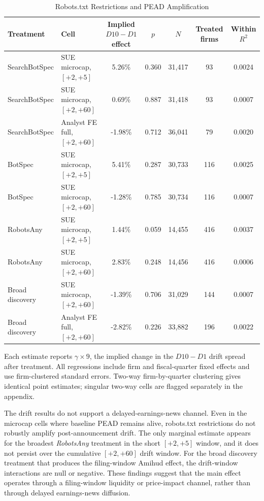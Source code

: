 \begin{table}[!htbp]
\centering
\caption{Robots.txt Restrictions and PEAD Amplification}
\label{tab:robots_pead_drift}
\begin{threeparttable}
\begin{tabular}{llccccc}
\toprule
Treatment & Cell & Implied \(D10-D1\) effect & \(p\) & \(N\) & Treated firms & Within \(R^2\) \\
\midrule
SearchBotSpec & SUE microcap, \([+2,+5]\)    &  5.26\% & 0.360 & 31,417 &  93 & 0.0024 \\
SearchBotSpec & SUE microcap, \([+2,+60]\)   &  0.69\% & 0.887 & 31,418 &  93 & 0.0007 \\
SearchBotSpec & Analyst FE full, \([+2,+60]\) & -1.98\% & 0.712 & 36,041 &  79 & 0.0020 \\
BotSpec       & SUE microcap, \([+2,+5]\)    &  5.41\% & 0.287 & 30,733 & 116 & 0.0025 \\
BotSpec       & SUE microcap, \([+2,+60]\)   & -1.28\% & 0.785 & 30,734 & 116 & 0.0007 \\
RobotsAny     & SUE microcap, \([+2,+5]\)    &  1.44\% & 0.059 & 14,455 & 416 & 0.0037 \\
RobotsAny     & SUE microcap, \([+2,+60]\)   &  2.83\% & 0.248 & 14,456 & 416 & 0.0006 \\
Broad discovery & SUE microcap, \([+2,+60]\) & -1.39\% & 0.706 & 31,029 & 144 & 0.0007 \\
Broad discovery & Analyst FE full, \([+2,+60]\) & -2.82\% & 0.226 & 33,882 & 196 & 0.0022 \\
\bottomrule
\end{tabular}
\begin{tablenotes}[flushleft]\footnotesize
\item Each estimate reports \(\gamma \times 9\), the implied change in the
\(D10-D1\) drift spread after treatment.  All regressions include firm and
fiscal-quarter fixed effects and use firm-clustered standard errors.
Two-way firm-by-quarter clustering gives identical point estimates; singular
two-way cells are flagged separately in the appendix.
\end{tablenotes}
\end{threeparttable}
\end{table}

The drift results do not support a delayed-earnings-news channel.  Even in
the microcap cells where baseline PEAD remains alive, robots.txt
restrictions do not robustly amplify post-announcement drift.  The only
marginal estimate appears for the broadest \textit{RobotsAny} treatment in
the short \([+2,+5]\) window, and it does not persist over the cumulative
\([+2,+60]\) drift window.  For the broad discovery treatment that produces
the filing-window Amihud effect, the drift-window interactions are null or
negative.  These findings suggest that the main effect operates through a
filing-window liquidity or price-impact channel, rather than through
delayed earnings-news diffusion.

